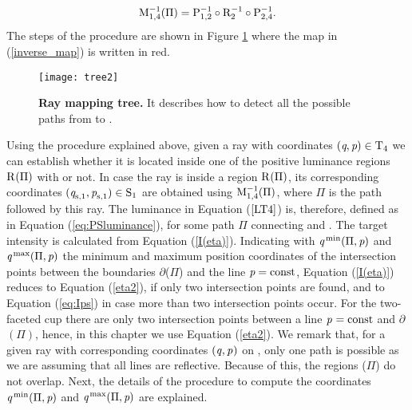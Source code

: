 \begin{equation}
\label{inverse_map}
\mathrm{M}_{{1,4}}^{-1}({\Pi}) = \mathrm{P}_{{1,2}}^{-1}
\circ \mathrm{R}_{{2}}^{-1}\circ \mathrm{P}_{{2,4}}^{-1}.
\end{equation}
The steps of the procedure are shown in Figure \ref{fig:tree} where the map in (\ref{inverse_map}) is written in red. \\
\begin{figure}
 \begin{center}
  \texttt{[image: tree2]}
\label{fig:tree}
  \end{center}
\caption{\textbf{Ray mapping tree.} It describes how to detect all the possible paths from  to .}
\label{fig:tree}
\end{figure}
Using the procedure explained above, given a ray with coordinates
$(\textit{q}, \textit{p})\in \mbox{$\textup{T}_{\textit{$4$}}$}$ we can establish whether it is located inside one of the positive luminance regions $\mbox{$\textup{R}_{\textit{}}$}(\Pi)$ with or not.
In case the ray is inside a region $\mbox{$\textup{R}_{\textit{}}$}(\Pi)$,
its corresponding coordinates $(\textit{q}_{\textrm{s,} \textit{$1$}},\textit{p}_{\textrm{s,} \textit{$1$}})\in \mbox{$\textup{S}_{\textit{$1$}}$}$ are obtained using $\mathrm{M}_{{1,4}}^{-1}(\Pi)$, where $\Pi$ is the path followed by this ray. The luminance in Equation ($\ref{LT4}$) is, therefore, defined as in Equation (\ref{eq:PSluminance}), 
for some path $\Pi$ connecting  and . The target intensity is calculated from Equation (\ref{I(eta)}). 
Indicating with $\textit{q}^\textrm{\,min}(\Pi,\textit{p})$ and $\textit{q}^\textrm{\,max}(\Pi,\textit{p})$ the minimum and maximum position coordinates of the intersection points between the boundaries $ \partial$($\Pi$) and the line $\textit{p}= \mbox{const}$,
Equation (\ref{I(eta)}) reduces to Equation (\ref{eta2}), if only two intersection points are found, and to Equation (\ref{eq:Ips}) in case more than two intersection points occur. For the two-faceted cup there are only two intersection points between a line $\textit{p}_{\textrm{} \textit{}}{}=\mbox{const}$ and $\partial$$(\Pi)$, hence, in this chapter we use Equation (\ref{eta2}).
We remark that, for a given ray with corresponding coordinates $(\textit{q}_{\textrm{} \textit{}}, \textit{p}_{\textrm{} \textit{}})$ on , only one path is possible as we are assuming that all lines are reflective.
Because of this, the regions ($\Pi$) do not overlap.
Next, the details of the procedure to compute the coordinates $\textit{q}^\textrm{\,min}(\Pi, \textit{p})$ and $\textit{q}^\textrm{\,max}(\Pi, \textit{p})$
are explained. 
